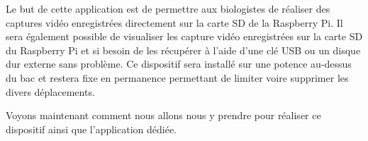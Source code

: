         Le but de cette application est de permettre aux biologistes de réaliser des captures vidéo enregistrées directement sur la carte SD de la Raspberry Pi.
        Il sera également possible de visualiser les capture vidéo enregistrées sur la carte SD du Raspberry Pi et si besoin de les récupérer à l'aide d'une clé USB ou un disque dur externe sans problème.
        Ce dispositif sera installé sur une potence au-dessus du bac et restera fixe en permanence permettant de limiter voire supprimer les divers déplacements.                
        
        \vspace{0.2cm}

        Voyons maintenant comment nous allons nous y prendre pour réaliser ce dispositif ainsi que l'application dédiée.
